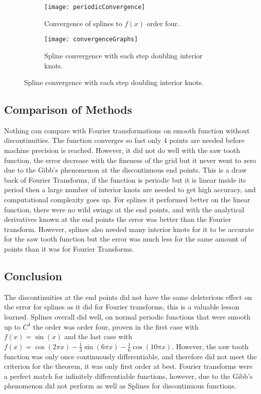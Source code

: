 \documentclass[]{article}
\begin{document}
\begin{figure}[H]
	\centering
	\begin{subfigure}{.4\textwidth}
		\texttt{[image: periodicConvergence]}
		\caption{Convergence of splines to $ f(x) $ order four.}
	\end{subfigure}
	\begin{subfigure}{.5\textwidth}
		\texttt{[image: convergenceGraphs]}
		\caption{Spline convergence with each step doubling interior knots.}
	\end{subfigure}
\end{figure}

\subsection*{Comparison of Methods}
Nothing can compare with Fourier transformations on smooth function without discontinuities. The function converges so fast only 4 points are needed before machine precision is reached. However, it did not do well with the saw tooth function, the error decrease with the fineness of the grid but it never went to zero due to the Gibb's phenomenon at the discontinuous end points. This is a draw back of Fourier Transforms, if the function is periodic but it is linear inside its period then a large number of interior knots are needed to get high accuracy, and computational complexity goes up. For splines it performed better on the linear function, there were no wild swings at the end points, and with the analytical derivatives known at the end points the error was better than the Fourier transform. However, splines also needed many interior knots for it to be accurate for the saw tooth function but the error was much less for the same amount of points than it was for Fourier Transforms. 

\subsection*{Conclusion} 
The discontinuities at the end points did not have the same deleterious effect on the error for splines as it did for Fourier transforms, this is a valuable lesson learned. Splines overall did well, on normal periodic functions that were smooth up to $ C^4 $ the order was order four, proven in the first case with $ f(x) = \sin(x) $ and the last case with $ f(x) = \cos(2\pi x) - \frac{1}{3}\sin(6\pi x) - \frac{1}{6} \cos(10\pi x)$. However, the saw tooth function was only once continuously differentiable, and therefore did not meet the criterion for the theorem, it was only first order at best. Fourier transforms were a perfect match for infinitely differentiable functions, however, due to the Gibb's phenomenon did not perform as well as Splines for discontinuous functions.  
\end{document}
